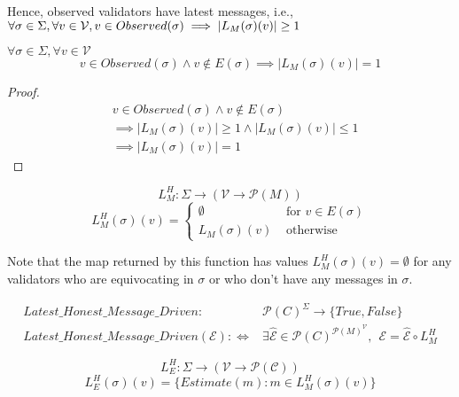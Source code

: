 Hence, observed validators have latest messages, i.e., $\forall \sigma \in \Sigma, \forall v \in \mathcal{V},\\ v \in Observed(\sigma) \implies |L_M(\sigma)(v)| \geq 1
$


\begin{lemma}
$\forall \sigma \in \Sigma, \forall v \in \mathcal{V}$
$$
v \in Observed(\sigma) \land v \notin E(\sigma) \implies |L_M(\sigma)(v)| = 1
$$
\end{lemma}

\begin{proof}
\begin{align*}
&v \in Observed(\sigma) \land v \notin E(\sigma)  \\
&\implies |L_M(\sigma)(v)| \geq 1 \land |L_M(\sigma)(v)| \leq 1 \\
&\implies |L_M(\sigma)(v)| = 1
\end{align*}
\end{proof}

\begin{defn}
$$
L^H_M:\Sigma \to (\mathcal{V} \to \mathcal{P}(M))
$$
\[ L^H_M(\sigma)(v) = \left\{
\begin{array}{ll}
      \emptyset& \text{ for } v \in E(\sigma) \\
      L_M(\sigma)(v)& \text{ otherwise }
\end{array}
\right. \]
\end{defn}

Note that the map returned by this function has values $L^H_M(\sigma)(v) = \emptyset$ for any validators who are equivocating in $\sigma$ or who don't have any messages in $\sigma$.


\begin{defn}
\begin{align*}
Latest\_Honest\_Message\_Driven:& \mathcal{P}(C)^\Sigma \to \{True, False\} \\
Latest\_Honest\_Message\_Driven(\mathcal{E}) :\Leftrightarrow& \exists \hat{\mathcal{E}} \in \mathcal{P}(C)^{\mathcal{P}(M)^\mathcal{V}}, ~~\mathcal{E} = \hat{\mathcal{E}} \circ L^H_M
\end{align*}
\end{defn}


\begin{defn}
$$
L^H_E:\Sigma \to (\mathcal{V} \to \mathcal{P}(\mathcal{C}))
$$
$$
L^H_E(\sigma)(v) = \{Estimate(m) : m \in L^H_M(\sigma)(v)\}
$$
\end{defn}

